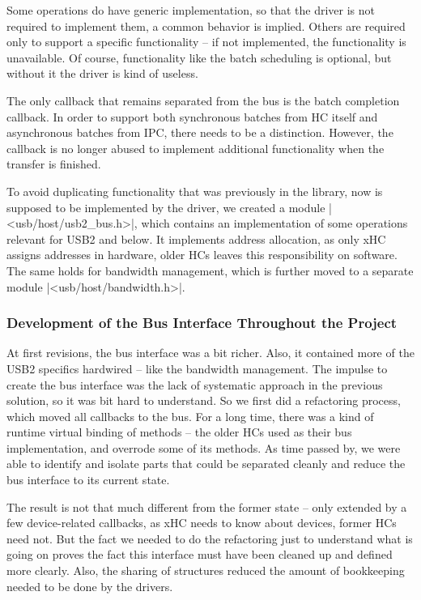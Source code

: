 Some operations do have generic implementation, so that the driver is not
required to implement them, a common behavior is implied. Others are required
only to support a specific functionality -- if not implemented, the
functionality is unavailable. Of course, functionality like the batch
scheduling is optional, but without it the driver is kind of useless.

The only callback that remains separated from the bus is the batch completion
callback. In order to support both synchronous batches from HC itself and
asynchronous batches from IPC, there needs to be a distinction. However, the
callback is no longer abused to implement additional functionality when the
transfer is finished.

To avoid duplicating functionality that was previously in the library, now is
supposed to be implemented by the driver, we created a module
\header|<usb/host/usb2_bus.h>|, which contains an implementation of some
operations relevant for USB2 and below. It implements address allocation, as
only xHC assigns addresses in hardware, older HCs leaves this responsibility on
software. The same holds for bandwidth management, which is further moved to
a separate module \header|<usb/host/bandwidth.h>|.

\subsubsection{Development of the Bus Interface Throughout the Project}

At first revisions, the bus interface was a bit richer. Also, it contained more
of the USB2 specifics hardwired -- like the bandwidth management. The impulse
to create the bus interface was the lack of systematic approach in the previous
solution, so it was bit hard to understand. So we first did a refactoring
process, which moved all callbacks to the bus. For a long time, there was
a kind of runtime virtual binding of methods -- the older HCs used
 as their bus implementation, and overrode some of its
methods. As time passed by, we were able to identify and isolate parts that
could be separated cleanly and reduce the bus interface to its current state.

The result is not that much different from the former state -- only extended by
a few device-related callbacks, as xHC needs to know about devices, former HCs
need not. But the fact we needed to do the refactoring just to understand what
is going on proves the fact this interface must have been cleaned up and
defined more clearly. Also, the sharing of structures reduced the amount of
bookkeeping needed to be done by the drivers.
